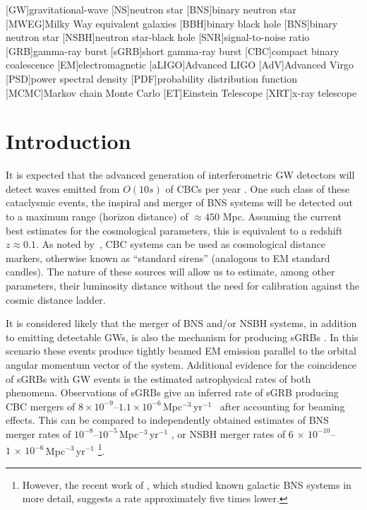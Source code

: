\documentclass[prd, twocolumn, lengthcheck, superscriptaddress, showpacs, letterpaper, nofootinbib]{revtex4-1}
\begin{document}
[GW]{gravitational-wave}
[NS]{neutron star}
[BNS]{binary neutron star}
[MWEG]{Milky Way equivalent galaxies}
[BBH]{binary black hole}
[BNS]{binary neutron star}
[NSBH]{neutron star-black hole}
[SNR]{signal-to-noise ratio}
[GRB]{gamma-ray burst}
[sGRB]{short gamma-ray burst}
[CBC]{compact binary coalescence}
[EM]{electromagnetic}
[aLIGO]{Advanced LIGO}
[AdV]{Advanced Virgo}
[PSD]{power spectral density}
[PDF]{probability distribution function}
[MCMC]{Markov chain Monte Carlo}
[ET]{Einstein Telescope}
[XRT]{x-ray telescope}

\section{Introduction\label{sec:intro}}

It is expected that the advanced generation of interferometric \ac{GW}
detectors will detect waves emitted from $O(10s)$ of \acp{CBC} per year
\cite{2010CQGra..27q3001A}. One such class of these cataclysmic
events, the inspiral and merger of \ac{BNS} systems will be detected out to a
maximum range (horizon distance) of $\approx 450$ Mpc. Assuming the
current best estimates for the cosmological parameters, this is equivalent to a
redshift $z\approx 0.1$. As noted by~\citet{1986Natur.323..310S}, \ac{CBC}
systems can be used as cosmological distance markers, otherwise known as
``standard sirens'' (analogous to \ac{EM} standard candles). The nature of
these sources will allow us to estimate, among other parameters, their
luminosity distance without the need for calibration against the cosmic
distance ladder.

It is considered likely that the merger of \ac{BNS} and/or \ac{NSBH} systems,
in addition to emitting detectable \acp{GW}, is also the mechanism for
producing \acp{sGRB} \cite{1992ApJ...395L..83N}. In this scenario these events
produce tightly beamed \ac{EM} emission parallel to the orbital angular
momentum vector of the system. Additional evidence for the coincidence of
\acp{sGRB} with \ac{GW} events is the estimated astrophysical rates of both
phenomena. Observations of \acp{sGRB} give an inferred rate of \ac{sGRB}
producing \ac{CBC} mergers of $8\times 10^{-9}$--$1.1\times
10^{-6}$\,Mpc$^{-3}$\,yr$^{-1}$~\cite{2012MNRAS.425.2668C} after accounting for
beaming effects. This can be compared to independently obtained estimates of
\ac{BNS} merger rates of $10^{-8}$--$10^{-5}$\,Mpc$^{-3}$\,yr$^{-1}$
\cite{2010CQGra..27q3001A}, or \ac{NSBH} merger rates of
$6\,\times\,10^{-10}$--$1\,\times\,10^{-6}$\,Mpc$^{-3}$\,yr$^{-1}$
\cite{2010CQGra..27q3001A}\footnote{However, the recent work of
\cite{2015MNRAS.448..928K}, which studied known galactic \ac{BNS} systems in
more detail, suggests a rate approximately five times lower.}.
  
\end{document}
